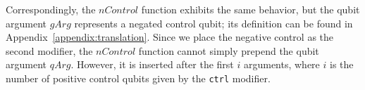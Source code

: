 Correspondingly, the $nControl$ function exhibits the same behavior, but the qubit argument $gArg$ represents a negated control qubit; its definition can be found in Appendix~\ref{appendix:translation}. Since we place the negative control as the second modifier, the $nControl$ function cannot simply prepend the qubit argument $qArg$. However, it is inserted after the first $i$ arguments, where $i$ is the number of positive control qubits given by the \texttt{ctrl} modifier.
